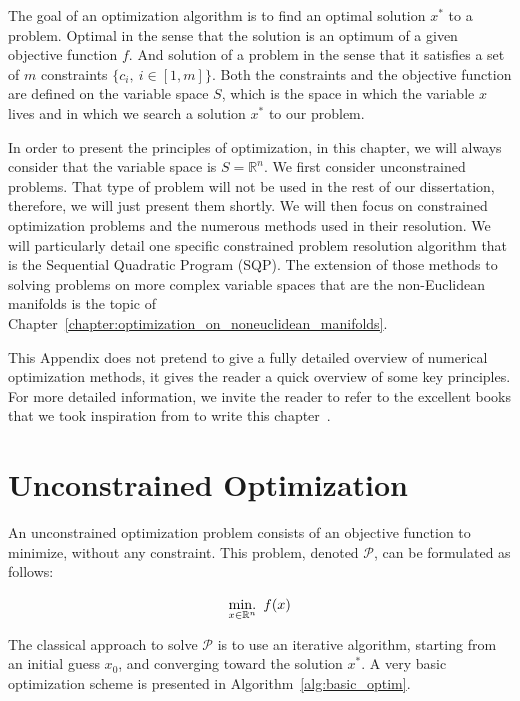 The goal of an optimization algorithm is to find an optimal solution $x^*$ to a problem.
Optimal in the sense that the solution is an optimum of a given objective function $f$.
And solution of a problem in the sense that it satisfies a set of $m$ constraints $\{c_i,\ i\in [1,m]\}$.
Both the constraints and the objective function are defined on the variable space $\mathit{S}$, which is the space in which the variable $x$ lives and in which we search a solution $x^*$ to our problem.

In order to present the principles of optimization, in this chapter, we will always consider that the variable space is $\mathit{S}=\mathbb{R}^n$.
We first consider unconstrained problems.
That type of problem will not be used in the rest of our dissertation, therefore, we will just present them shortly.
We will then focus on constrained optimization problems and the numerous methods used in their resolution.
We will particularly detail one specific constrained problem resolution algorithm that is the Sequential Quadratic Program (SQP).
The extension of those methods to solving problems on more complex variable spaces that are the non-Euclidean manifolds is the topic of Chapter~\ref{chapter:optimization_on_noneuclidean_manifolds}.

This Appendix does not pretend to give a fully detailed overview of numerical optimization methods, it gives the reader a quick overview of some key principles.
For more detailed information, we invite the reader to refer to the excellent books that we took inspiration from to write this chapter~\cite{nocedal:book:2006, bonnans:book:2003, boyd2004convex}.

\section{Unconstrained Optimization}

An unconstrained optimization problem consists of an objective function to minimize, without any constraint.
This problem, denoted $\mathcal{P}$, can be formulated as follows:

\begin{equation}
  \operatorname*{min.}_{x\in\mathbb{R}^n}\ {f(x)}
\label{eq:unconstrainedOptim}
\end{equation}

The classical approach to solve $\mathcal{P}$ is to use an iterative algorithm, starting from an initial guess $x_0$, and converging toward the solution $x^*$.
A very basic optimization scheme is presented in Algorithm~\ref{alg:basic_optim}.


